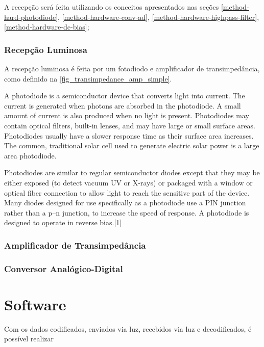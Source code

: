 		A recepção será feita utilizando os conceitos apresentados nas seções \ref{method-hard-photodiode}, \ref{method-hardware-conv-ad}, \ref{method-hardware-highpass-filter}, \ref{method-hardware-dc-bias};
		
	\subsubsection{Recepção Luminosa}
		
		A recepção luminosa é feita por um fotodiodo e amplificador de transimpedância, como definido na \autoref{fig_transimpedance_amp_simple}. 
		
		A photodiode is a semiconductor device that converts light into current. The current is generated when photons are absorbed in the photodiode. A small amount of current is also produced when no light is present. Photodiodes may contain optical filters, built-in lenses, and may have large or small surface areas. Photodiodes usually have a slower response time as their surface area increases. The common, traditional solar cell used to generate electric solar power is a large area photodiode.
		
		Photodiodes are similar to regular semiconductor diodes except that they may be either exposed (to detect vacuum UV or X-rays) or packaged with a window or optical fiber connection to allow light to reach the sensitive part of the device. Many diodes designed for use specifically as a photodiode use a PIN junction rather than a p–n junction, to increase the speed of response. A photodiode is designed to operate in reverse bias.[1]

		
		
	\subsubsection{Amplificador de Transimpedância}
	
	\subsubsection{Conversor Analógico-Digital}
	
	\section{Software}
		Com os dados codificados, enviados via luz, recebidos via luz e decodificados, é possível realizar 